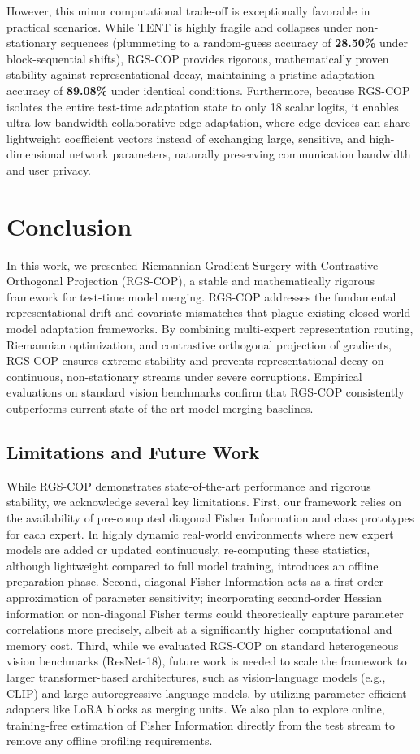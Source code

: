 \documentclass{article}
\theoremstyle{plain}
\theoremstyle{definition}
\theoremstyle{remark}
\begin{document}
However, this minor computational trade-off is exceptionally favorable in practical scenarios. While TENT is highly fragile and collapses under non-stationary sequences (plummeting to a random-guess accuracy of \textbf{28.50\%} under block-sequential shifts), RGS-COP provides rigorous, mathematically proven stability against representational decay, maintaining a pristine adaptation accuracy of \textbf{89.08\%} under identical conditions. Furthermore, because RGS-COP isolates the entire test-time adaptation state to only 18 scalar logits, it enables ultra-low-bandwidth collaborative edge adaptation, where edge devices can share lightweight coefficient vectors instead of exchanging large, sensitive, and high-dimensional network parameters, naturally preserving communication bandwidth and user privacy.

\section{Conclusion}
In this work, we presented Riemannian Gradient Surgery with Contrastive Orthogonal Projection (RGS-COP), a stable and mathematically rigorous framework for test-time model merging. RGS-COP addresses the fundamental representational drift and covariate mismatches that plague existing closed-world model adaptation frameworks. By combining multi-expert representation routing, Riemannian optimization, and contrastive orthogonal projection of gradients, RGS-COP ensures extreme stability and prevents representational decay on continuous, non-stationary streams under severe corruptions. Empirical evaluations on standard vision benchmarks confirm that RGS-COP consistently outperforms current state-of-the-art model merging baselines.

\subsection{Limitations and Future Work}
While RGS-COP demonstrates state-of-the-art performance and rigorous stability, we acknowledge several key limitations. First, our framework relies on the availability of pre-computed diagonal Fisher Information and class prototypes for each expert. In highly dynamic real-world environments where new expert models are added or updated continuously, re-computing these statistics, although lightweight compared to full model training, introduces an offline preparation phase. Second, diagonal Fisher Information acts as a first-order approximation of parameter sensitivity; incorporating second-order Hessian information or non-diagonal Fisher terms could theoretically capture parameter correlations more precisely, albeit at a significantly higher computational and memory cost. Third, while we evaluated RGS-COP on standard heterogeneous vision benchmarks (ResNet-18), future work is needed to scale the framework to larger transformer-based architectures, such as vision-language models (e.g., CLIP) and large autoregressive language models, by utilizing parameter-efficient adapters like LoRA blocks as merging units. We also plan to explore online, training-free estimation of Fisher Information directly from the test stream to remove any offline profiling requirements.
\end{document}
